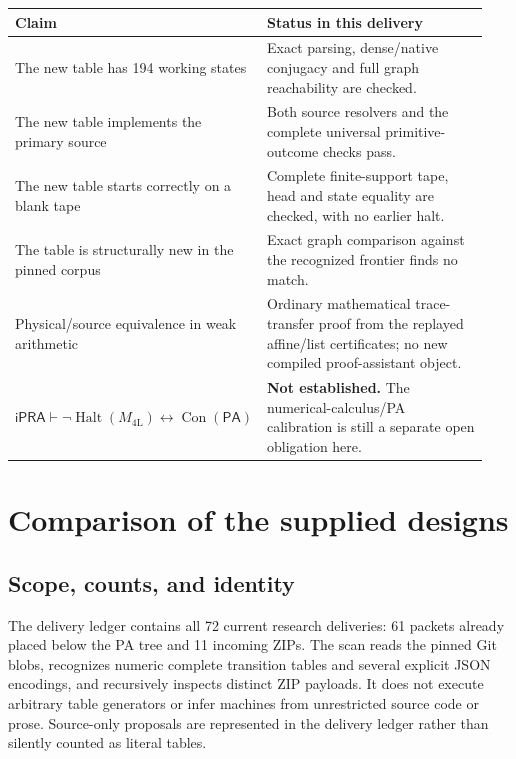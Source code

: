 \documentclass[10pt,letterpaper]{article}
\newcommand{\ipra}{\mathsf{iPRA}}
\newcommand{\pa}{\mathsf{PA}}
\newcommand{\Con}{\operatorname{Con}}
\newcommand{\Halt}{\operatorname{Halt}}
\newcommand{\NewM}{M_{\mathrm{4L}}}
\begin{document}
\begin{center}
\begin{tabular}{@{}p{0.36\linewidth}p{0.58\linewidth}@{}}
\toprule
Claim & Status in this delivery\\\midrule
The new table has 194 working states & Exact parsing, dense/native
conjugacy and full graph reachability are checked.\\[3pt]
The new table implements the primary source & Both source resolvers and
the complete universal primitive-outcome checks pass.\\[3pt]
The new table starts correctly on a blank tape & Complete finite-support
tape, head and state equality are checked, with no earlier halt.\\[3pt]
The table is structurally new in the pinned corpus & Exact graph
comparison against the recognized frontier finds no match.\\[3pt]
Physical/source equivalence in weak arithmetic & Ordinary mathematical
trace-transfer proof from the replayed affine/list certificates; no new
compiled proof-assistant object.\\[3pt]
$\ipra\vdash\neg\Halt(\NewM)\leftrightarrow\Con(\pa)$ &
\textbf{Not established.} The numerical-calculus/PA calibration is still
a separate open obligation here.\\
\bottomrule
\end{tabular}
\end{center}

\section{Comparison of the supplied designs}
\label{sec:comparison}

\subsection{Scope, counts, and identity}

The delivery ledger contains all 72 current research deliveries: 61
packets already placed below the PA tree and 11 incoming ZIPs. The scan
reads the pinned Git blobs, recognizes numeric complete transition tables
and several explicit JSON encodings, and recursively inspects distinct
ZIP payloads. It does not execute arbitrary table generators or infer
machines from unrestricted source code or prose. Source-only proposals
are represented in the delivery ledger rather than silently counted as
literal tables.
\end{document}
